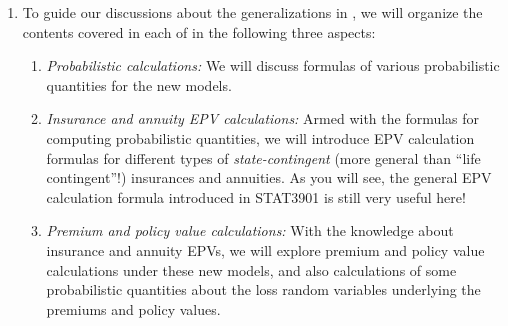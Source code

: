 \begin{enumerate}
 is about a more practically useful topic, namely
analyzing \emph{profits}. The ultimate goal of selling insurance products is to
make profits (right?), so certainly this is a topic deserving attention. We put
it at the last as we are going to apply some concepts learnt in the prior
sections to the profit analysis. This section is perhaps (?) the easiest part
in STAT3909 and can be your ``grade saver'' .\footnote{Note
however that \(\text{``easiest''}\ne\text{``easy''}\). Certainly you still need
to pay (substantial) effort on studying this section in order for it to
``save your grade'' (hopefully).}

\item To guide our discussions about the generalizations in
, we
will organize the contents covered in each of
 in
the following three aspects:
\begin{enumerate}[label={(\arabic*)}]
\item \emph{Probabilistic calculations:} We will discuss formulas of various
probabilistic quantities for the new models.

\item \emph{Insurance and annuity EPV calculations:} Armed with the formulas
for computing probabilistic quantities, we will introduce EPV calculation
formulas for different types of \emph{state-contingent} (more general than
``life contingent''!) insurances and annuities. As you will see, the general
EPV calculation formula introduced in STAT3901 is still very useful
 here!

\item \emph{Premium and policy value calculations:} With the knowledge about
insurance and annuity EPVs, we will explore premium and policy value
calculations under these new models, and also calculations of some
probabilistic quantities about the loss random variables underlying the
premiums and policy values.
\end{enumerate}
\end{enumerate}
